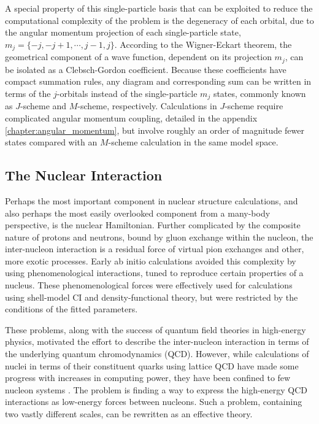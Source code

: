 \documentclass[thesis.tex]{subfiles}
\begin{document}
A special property of this single-particle basis that can be exploited to reduce the computational complexity of the problem is the degeneracy of each orbital, due to the angular momentum projection of each single-particle state, $m_{j} = \{ -j, -j+1, \cdots , j-1, j \}$.  According to the Wigner-Eckart theorem, the geometrical component of a wave function, dependent on its projection $m_{j}$, can be isolated as a Clebsch-Gordon coefficient.  Because these coefficients have compact summation rules, any diagram and corresponding sum can be written in terms of the $j$-orbitals instead of the single-particle $m_{j}$ states, commonly known as $J$-scheme and $M$-scheme, respectively.  Calculations in $J$-scheme require complicated angular momentum coupling, detailed in the appendix \ref{chapter:angular_momentum}, but involve roughly an order of magnitude fewer states compared with an $M$-scheme calculation in the same model space.


\subsection{The Nuclear Interaction} \label{section:nuclear_interaction}

Perhaps the most important component in nuclear structure calculations, and also perhaps the most easily overlooked component from a many-body perspective, is the nuclear Hamiltonian.  Further complicated by the composite nature of protons and neutrons, bound by gluon exchange within the nucleon, the inter-nucleon interaction is a residual force of virtual pion exchanges and other, more exotic processes.  Early ab initio calculations avoided this complexity by using phenomenological interactions, tuned to reproduce certain properties of a nucleus.  These phenomenological forces were effectively used for calculations using shell-model CI and density-functional theory, but were restricted by the conditions of the fitted parameters.

These problems, along with the success of quantum field theories in high-energy physics, motivated the effort to describe the inter-nucleon interaction in terms of the underlying quantum chromodynamics (QCD).  However, while calculations of nuclei in terms of their constituent quarks using lattice QCD have made some progress with increases in computing power, they have been confined to few nucleon systems \cite{BEANE2012}.  The problem is finding a way to express the high-energy QCD interactions as low-energy forces between nucleons.  Such a problem, containing two vastly different scales, can be rewritten as an effective theory.
\end{document}
